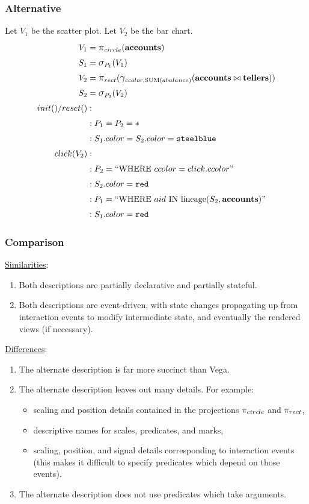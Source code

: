 \documentclass[fleqn]{sigplanconf}
\begin{document}
\subsubsection{Alternative}
Let $V_1$ be the scatter plot.
Let $V_2$ be the bar chart.
\begin{align*}
	V_1&= \mathlarger{\pi}_{circle}(\bf{accounts})\\
	S_1&= \mathlarger{\sigma}_{P_1}(V_1)\\
	V_2&= \mathlarger{\pi}_{rect}(\mathlarger{\gamma}_{ccolor, \text{SUM}(abalance)}(\bf{accounts}\bowtie{}\bf{tellers}))\\
	S_2&= \mathlarger{\sigma}_{P_2}(V_2)\\
	init()/reset()&:\\
	&: P_1 = P_2 = *\\
	&: S_1.color = S_2.color = \texttt{steelblue}\\
	click(V_2)&:\\
	&: P_2 = ``\text{WHERE}~ccolor=click.ccolor"\\
	&: S_2.color = \texttt{red}\\
	&: P_1 = ``\text{WHERE}~aid~\text{IN~lineage}(S_2, \bf{accounts})"\\
	&: S_1.color = \texttt{red}\\
\end{align*}
\subsubsection{Comparison}
\underline{Similarities}:
\begin{enumerate}
	\item Both descriptions are partially declarative and partially stateful.
	\item Both descriptions are event-driven, with state changes propagating up from interaction events to modify intermediate state, and eventually the rendered views (if necessary).
\end{enumerate}
\underline{Differences}:
\begin{enumerate}
	\item The alternate description is far more succinct than Vega.
	\item The alternate description leaves out many details.
		For example:
		\begin{itemize}
			\item scaling and position details contained in the projections $\mathlarger{\pi}_{circle}$ and $\mathlarger{\pi}_{rect}$,
			\item descriptive names for scales, predicates, and marks,
			\item scaling, position, and signal details corresponding to interaction events (this makes it difficult to specify predicates which depend on those events).
		\end{itemize}
	\item The alternate description does not use predicates which take arguments.
\end{enumerate}
\end{document}
